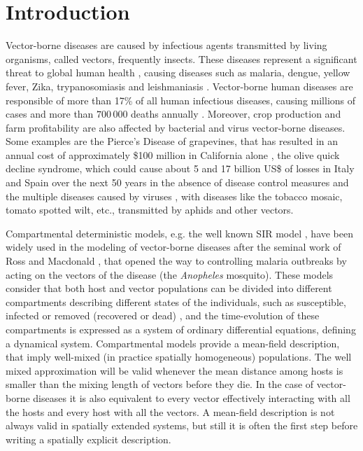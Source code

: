\section{Introduction}\label{sec:intro}

Vector-borne diseases are caused by infectious agents transmitted by living
organisms, called vectors,  frequently insects. These diseases represent a
significant threat to global human health \cite{Athni_2020}, causing diseases
such as malaria, dengue, yellow fever, Zika, trypanosomiasis and leishmaniasis
\cite{SCHUMACHER2018352}. Vector-borne human diseases are responsible of more
than 17\% of all human infectious diseases, causing millions of cases and more
than $700\,000$ deaths annually \cite{WHO}. Moreover, crop production and farm
profitability are also affected by bacterial \cite{HUANG20201379} and virus
\cite{Bragard2013} vector-borne diseases. Some examples are the Pierce's
Disease of grapevines, that has resulted in an annual cost of approximately
\$100 million in California alone \cite{tumber2014pierce}, the olive quick
decline syndrome, which could cause about 5 and 17 billion US\$ of losses in
Italy and Spain over the next 50 years in the absence of disease control
measures \cite{Schneider2020} and the multiple diseases caused by viruses
\cite{Rybicki2015}, with diseases like the tobacco mosaic, tomato spotted
wilt, etc., transmitted by aphids and other vectors.

Compartmental deterministic models, e.g. the well known SIR model
\cite{Kermack1927}, have been widely used in the modeling of vector-borne
diseases after the seminal work of Ross and Macdonald \cite{Macdonald1957},
that opened the way to controlling malaria outbreaks by acting on the vectors
of the disease (the \textit{Anopheles} mosquito). These models consider that
both host and vector populations can be divided into different compartments
describing different states of the individuals, such as susceptible, infected
or removed (recovered or dead) \cite{Brauer2008}, and the time-evolution of
these compartments is expressed as a system of ordinary differential equations,
defining a dynamical system. Compartmental models provide a mean-field
description, that imply well-mixed (in practice spatially homogeneous)
populations. The well mixed approximation will be valid whenever the mean
distance among hosts is smaller than the mixing length of vectors before they
die. In the case of vector-borne diseases it is also equivalent to every vector
effectively interacting with all the hosts and every host with all the vectors.
A mean-field description is not always valid in spatially extended systems, but
still it is often the first step before writing a spatially explicit
description.

